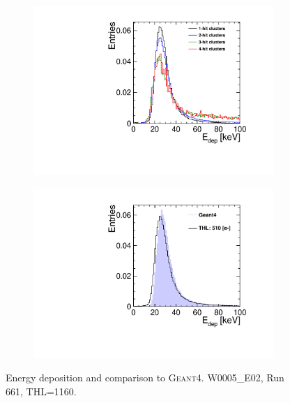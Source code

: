 \begin{figure}[htbp] \centering
  \begin{subfigure}[b]{0.45\textwidth}
    \includegraphics[width=\textwidth]{./figures/Calibration/Edep_Clusters_W0005_E02.pdf}
    \caption{}
  \end{subfigure}\hfill
  \begin{subfigure}[b]{0.45\textwidth}
    \includegraphics[width=\textwidth]{./figures/Calibration/Edep_G4_W0005_E02.pdf}
    \caption{}
  \end{subfigure}
  \caption{Energy deposition and comparison to
    \textsc{Geant4}. W0005\_E02, Run 661, THL=1160.}
  \label{fig:EdepW19L8}
\end{figure}

